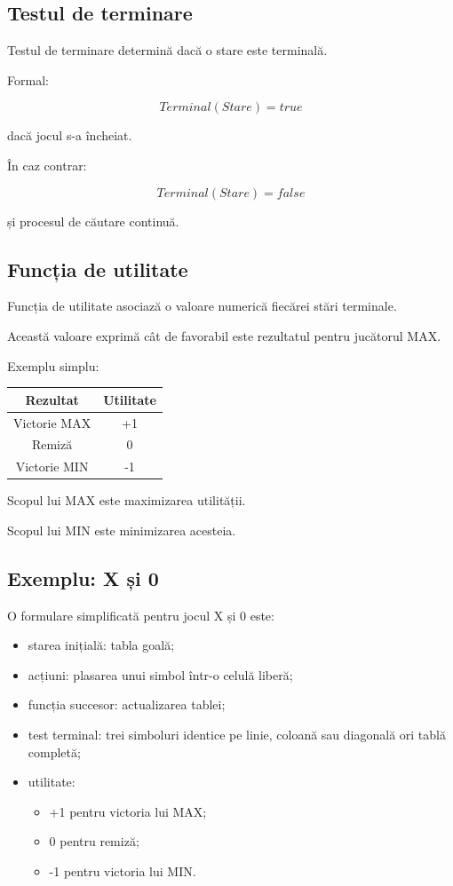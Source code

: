 \documentclass[12pt,a4paper]{article}
\begin{document}
\subsection{Testul de terminare}

Testul de terminare determină dacă o stare este terminală.

Formal:

\[
Terminal(Stare)
=
true
\]

dacă jocul s-a încheiat.

În caz contrar:

\[
Terminal(Stare)
=
false
\]

și procesul de căutare continuă.

\subsection{Funcția de utilitate}

Funcția de utilitate asociază o valoare numerică fiecărei stări terminale.

Această valoare exprimă cât de favorabil este rezultatul pentru jucătorul MAX.

Exemplu simplu:

\begin{center}
\begin{tabular}{|c|c|}
\hline
Rezultat & Utilitate \\
\hline
Victorie MAX & +1 \\
\hline
Remiză & 0 \\
\hline
Victorie MIN & -1 \\
\hline
\end{tabular}
\end{center}

Scopul lui MAX este maximizarea utilității.

Scopul lui MIN este minimizarea acesteia.

\subsection{Exemplu: X și 0}

O formulare simplificată pentru jocul X și 0 este:

\begin{itemize}
\item starea inițială: tabla goală;
\item acțiuni: plasarea unui simbol într-o celulă liberă;
\item funcția succesor: actualizarea tablei;
\item test terminal: trei simboluri identice pe linie, coloană sau diagonală ori tablă completă;
\item utilitate:
    \begin{itemize}
    \item +1 pentru victoria lui MAX;
    \item 0 pentru remiză;
    \item -1 pentru victoria lui MIN.
    \end{itemize}
\end{itemize}
\end{document}
